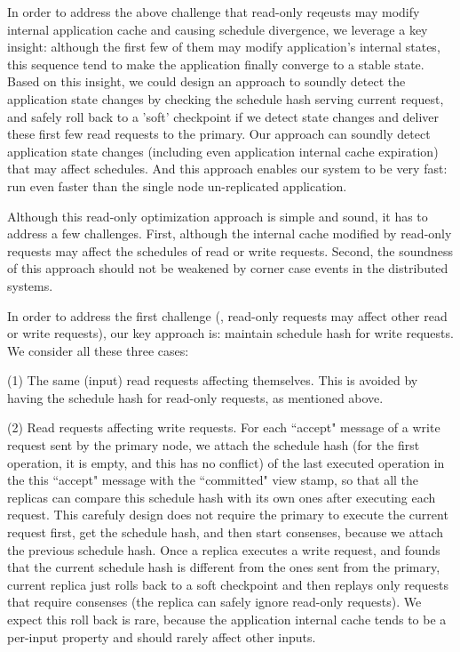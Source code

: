 In order to address the above challenge that read-only reqeusts may modify internal 
application cache and causing schedule divergence, we leverage a key 
insight: although the first few of them may modify application's internal states, this 
sequence tend to make the application finally converge to a stable state. Based 
on this insight, we could design an approach to soundly detect the application 
state changes by checking the schedule hash serving current request, and 
safely roll back to a 'soft' checkpoint if we detect state changes and 
deliver these first few read requests to the primary. Our approach can soundly 
detect application state changes (including even application internal cache 
expiration) that may affect schedules. And this approach enables our system 
to be very fast: run even faster than the single node un-replicated 
application.

Although this read-only optimization approach is simple and sound, it has to 
address a few challenges. First, although the internal cache modified by read-only 
requests may affect the schedules of read or write requests. Second, the 
soundness of this approach should not be weakened by corner case events in the 
distributed systems.

In order to address the first challenge (\ie, read-only requests may affect 
other read or write requests), our key approach is: maintain schedule hash for write 
requests. We consider all these three cases:

(1) The same (input) read requests affecting themselves. This is avoided by 
having the schedule hash for read-only requests, as mentioned above.

(2) Read requests affecting write requests. For each ``accept" message of a 
write request sent by the \paxos primary node, we attach the schedule hash (for 
the first operation, it is empty, and this has no conflict) of 
the last executed operation in the this ``accept" message with the ``committed" 
view stamp, so that all the replicas can compare this schedule hash with its 
own ones after executing each request. This carefuly design does not require 
the primary to execute the current request first, get the schedule hash, and 
then start consenses, because we attach the previous schedule hash. Once a 
replica executes a write request, and founds that the current schedule hash is 
different from the ones sent from the primary, current replica just rolls back 
to a soft checkpoint and then replays only requests that require consenses (the 
replica can safely ignore read-only requests). We expect this roll back is 
rare, because the application internal cache tends to be a per-input property 
and should rarely affect other inputs.

